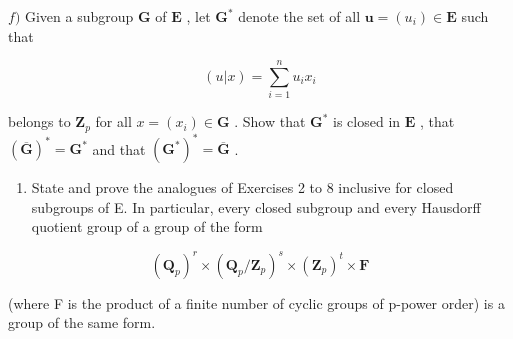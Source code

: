 \(f)\) Given a subgroup \(\mathbf{G}\) of \(\mathbf{E}\) , let \(\mathbf{G}^*\) denote the set of all \(\boldsymbol{u} = (u_i) \in \mathbf{E}\) such that

\[
(u | x) = \sum_ {i = 1} ^ {n} u _ {i} x _ {i}
\]

belongs to \(\mathbf{Z}_p\) for all \(x = (x_i) \in \mathbf{G}\) . Show that \(\mathbf{G}^*\) is closed in \(\mathbf{E}\) , that \((\overline{\mathbf{G}})^* = \mathbf{G}^*\) and that \((\mathbf{G}^*)^* = \overline{\mathbf{G}}\) .

\begin{enumerate}
\def\labelenumi{\alph{enumi})}
\setcounter{enumi}{6}
\tightlist
\item
  State and prove the analogues of Exercises 2 to 8 inclusive for closed subgroups of E. In particular, every closed subgroup and every Hausdorff quotient group of a group of the form
\end{enumerate}

\[
(\mathbf {Q} _ {p}) ^ {r} \times (\mathbf {Q} _ {p} / \mathbf {Z} _ {p}) ^ {s} \times (\mathbf {Z} _ {p}) ^ {t} \times \mathbf {F}
\]

(where F is the product of a finite number of cyclic groups of p-power order) is a group of the same form.

